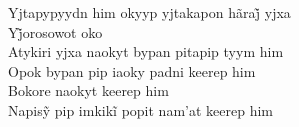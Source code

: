 \begin{linenumbers}\begingroup\raggedright
 
\noindent   Yjtapypyydn him okyyp yjtakapon hãraj̃ yjxa\\
  Yj̃orosowot oko\\
  Atykiri yjxa naokyt bypan pitapip tyym him\\
  Opok bypan pip iaoky padni keerep him\\
  Bokore naokyt keerep him\\
  Napisỹ pip imkikĩ popit nam’at keerep him
 
\end{linenumbers}\endgroup

\bigskip

